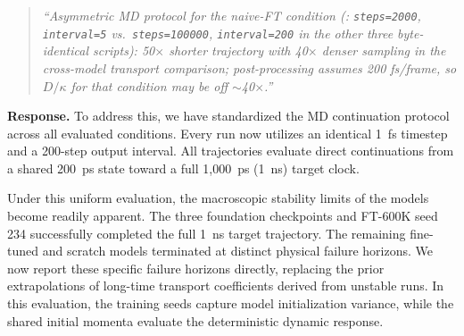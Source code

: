\documentclass[11pt]{article}
\begin{document}
\begin{quote}\small \itshape
``Asymmetric MD protocol for the naive-FT condition (: \texttt{steps=2000}, \texttt{interval=5} vs.\ \texttt{steps=100000}, \texttt{interval=200} in the other three byte-identical scripts): 50$\times$ shorter trajectory with 40$\times$ denser sampling in the cross-model transport comparison; post-processing assumes 200 fs/frame, so $D/\kappa$ for that condition may be off $\sim$40$\times$.''\end{quote}

\textbf{Response.} 
To address this, we have standardized the MD continuation protocol across all evaluated conditions. Every run now utilizes an identical 1~fs timestep and a 200-step output interval. All trajectories evaluate direct continuations from a shared 200~ps state toward a full 1,000~ps (1~ns) target clock.

Under this uniform evaluation, the macroscopic stability limits of the models become readily apparent. The three foundation checkpoints and FT-600K seed 234 successfully completed the full 1~ns target trajectory. The remaining fine-tuned and scratch models terminated at distinct physical failure horizons. We now report these specific failure horizons directly, replacing the prior extrapolations of long-time transport coefficients derived from unstable runs. In this evaluation, the training seeds capture model initialization variance, while the shared initial momenta evaluate the deterministic dynamic response.
\end{document}
